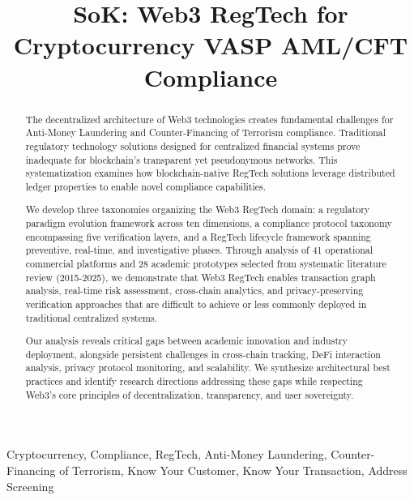 \documentclass[conference,compsoc]{IEEEtran}
\begin{document}
\title{SoK: Web3 RegTech for Cryptocurrency VASP AML/CFT Compliance}

\author{
}

\newcommand{\fullcirc}{$\bullet$}
\newcommand{\halfcirc}{$\circ$}
\newcommand{\emptycirc}{---}

\maketitle

\begin{abstract}
The decentralized architecture of Web3 technologies creates fundamental challenges for Anti-Money Laundering and Counter-Financing of Terrorism compliance. Traditional regulatory technology solutions designed for centralized financial systems prove inadequate for blockchain's transparent yet pseudonymous networks. This systematization examines how blockchain-native RegTech solutions leverage distributed ledger properties to enable novel compliance capabilities.

We develop three taxonomies organizing the Web3 RegTech domain: a regulatory paradigm evolution framework across ten dimensions, a compliance protocol taxonomy encompassing five verification layers, and a RegTech lifecycle framework spanning preventive, real-time, and investigative phases. Through analysis of 41 operational commercial platforms and 28 academic prototypes selected from systematic literature review (2015-2025), we demonstrate that Web3 RegTech enables transaction graph analysis, real-time risk assessment, cross-chain analytics, and privacy-preserving verification approaches that are difficult to achieve or less commonly deployed in traditional centralized systems.

Our analysis reveals critical gaps between academic innovation and industry deployment, alongside persistent challenges in cross-chain tracking, DeFi interaction analysis, privacy protocol monitoring, and scalability. We synthesize architectural best practices and identify research directions addressing these gaps while respecting Web3's core principles of decentralization, transparency, and user sovereignty.
\end{abstract}

\begin{IEEEkeywords}
Cryptocurrency, Compliance, RegTech, Anti-Money Laundering, Counter-Financing of Terrorism, Know Your Customer, Know Your Transaction, Address Screening
\end{IEEEkeywords}
\end{document}
